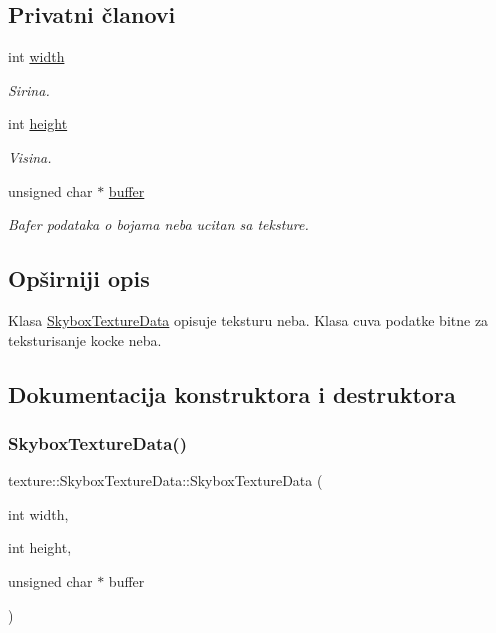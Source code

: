 \subsection*{Privatni članovi}
\begin{DoxyCompactItemize}
\item 
int \hyperlink{classtexture_1_1SkyboxTextureData_a25bc82e26b87789657821ac97bedce70}{width}
\begin{DoxyCompactList}\small\item\em Sirina. \end{DoxyCompactList}\item 
int \hyperlink{classtexture_1_1SkyboxTextureData_a84d53105b97dad004f7699ccfd8342eb}{height}
\begin{DoxyCompactList}\small\item\em Visina. \end{DoxyCompactList}\item 
unsigned char $\ast$ \hyperlink{classtexture_1_1SkyboxTextureData_a886497e955648aba2f465c6a7ba91c3f}{buffer}
\begin{DoxyCompactList}\small\item\em Bafer podataka o bojama neba ucitan sa teksture. \end{DoxyCompactList}\end{DoxyCompactItemize}


\subsection{Opširniji opis}
Klasa \hyperlink{classtexture_1_1SkyboxTextureData}{Skybox\+Texture\+Data} opisuje teksturu neba. Klasa cuva podatke bitne za teksturisanje kocke neba. 

\subsection{Dokumentacija konstruktora i destruktora}
\mbox{\label{classtexture_1_1SkyboxTextureData_aeefd7cfb2aff6989bf6fff15f4d9ba12}} 
\subsubsection{\texorpdfstring{Skybox\+Texture\+Data()}{SkyboxTextureData()}}
{\footnotesize\ttfamily texture\+::\+Skybox\+Texture\+Data\+::\+Skybox\+Texture\+Data (\begin{DoxyParamCaption}\item[{int}]{width,  }\item[{int}]{height,  }\item[{unsigned char $\ast$}]{buffer }\end{DoxyParamCaption})}



